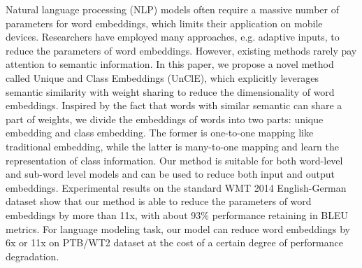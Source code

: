 Natural language processing (NLP) models often require a massive number of parameters for word embeddings, which limits their application on mobile devices. Researchers have employed many approaches, e.g. adaptive inputs, to reduce the parameters of word embeddings. However, existing methods rarely pay attention to semantic information. In this paper, we propose a novel method called Unique and Class Embeddings (UnClE), which explicitly leverages semantic similarity with weight sharing to reduce the dimensionality of word embeddings. Inspired by the fact that words with similar semantic can share a part of weights, we divide the embeddings of words into two parts: unique embedding and class embedding. The former is one-to-one mapping like traditional embedding, while the latter is many-to-one mapping and learn the representation of class information. Our method is suitable for both word-level and sub-word level models and can be used to reduce both input and output embeddings. Experimental results on the standard WMT 2014 English-German dataset show that our method is able to reduce the parameters of word embeddings by more than 11x, with about 93\% performance retaining in BLEU metrics. For language modeling task, our model can reduce word embeddings by 6x or 11x on PTB/WT2 dataset at the cost of a certain degree of performance degradation.
